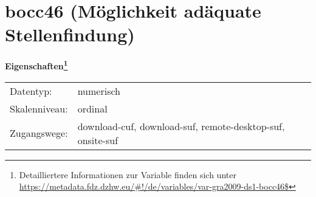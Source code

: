
    \setcounter{footnote}{0}

    \vspace*{-1.8cm}
	\section{bocc46 (Möglichkeit adäquate Stellenfindung)}
	\label{section:bocc46}



    \vspace*{0.5cm}
    \noindent\textbf{Eigenschaften\footnote{Detailliertere Informationen zur Variable finden sich unter
		\url{https://metadata.fdz.dzhw.eu/\#!/de/variables/var-gra2009-ds1-bocc46$}}}\\
	\begin{tabularx}{\hsize}{@{}lX}
	Datentyp: & numerisch \\
	Skalenniveau: & ordinal \\
	Zugangswege: &
	  download-cuf, 
	  download-suf, 
	  remote-desktop-suf, 
	  onsite-suf
 \\
    \end{tabularx}



